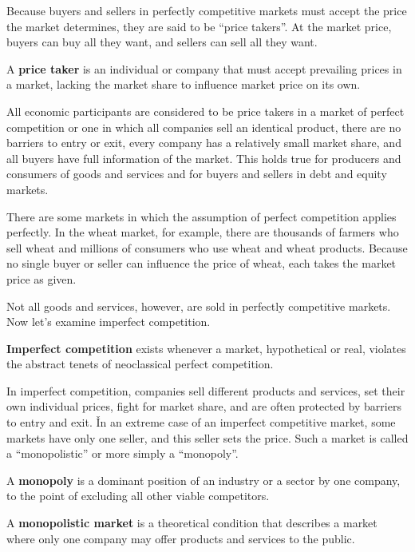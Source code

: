 Because buyers and sellers in perfectly competitive markets must accept the price the market determines, they are
said to be ``price takers''. At the market price, buyers can buy all they want, and sellers can sell all they want.

A \textbf{price taker} is an individual or company that must accept prevailing prices in a market, lacking the market
share to influence market price on its own.
\ed

All economic participants are considered to be price takers in a market of perfect competition or one in which all
companies sell an identical product, there are no barriers to entry or exit, every company has a relatively small
market share, and all buyers have full information of the market. This holds true for producers and consumers of
goods and services and for buyers and sellers in debt and equity markets.

\be
There are some markets in which the assumption of perfect competition applies perfectly. In the wheat market, for
example, there are thousands of farmers who sell wheat and millions of consumers who use wheat and wheat products.
Because no single buyer or seller can influence the price of wheat, each takes the market price as given.
\ee

Not all goods and services, however, are sold in perfectly competitive markets. Now let's examine imperfect competition.

\textbf{Imperfect competition} exists whenever a market, hypothetical or real, violates the abstract tenets of
neoclassical perfect competition.
\ed

In imperfect competition, companies sell different products and services, set their own individual prices, fight for
market share, and are often protected by barriers to entry and exit. \v

In an extreme case of an imperfect competitive market, some markets have only one seller, and this seller sets the
price. Such a market is called a ``monopolistic'' or more simply a ``monopoly''.

\bd[Monopoly]
A \textbf{monopoly} is a dominant position of an industry or a sector by one company, to the point of excluding all
other viable competitors.
\ed

A \textbf{monopolistic market} is a theoretical condition that describes a market where only one company may offer
products and services to the public.
\ed

